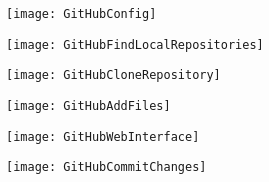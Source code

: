 \documentclass[swedish]{beamer}
\newenvironment{dialogue}{%
\VerbatimEnvironment
\begin{Verbatim}[fontsize=\footnotesize,commandchars=\#\(\)]%
}
{%
\end{Verbatim}
}
\begin{document}
\begin{frame}[fragile]
\texttt{[image: GitHubConfig]}
\end{frame}

\begin{frame}[fragile]
\texttt{[image: GitHubFindLocalRepositories]}
\end{frame}

\begin{frame}
\texttt{[image: GitHubCloneRepository]}
\end{frame}

\begin{frame}[fragile]
\texttt{[image: GitHubAddFiles]}
\end{frame}

\begin{frame}[fragile]
\texttt{[image: GitHubWebInterface]}
\end{frame}

\begin{frame}[fragile]
\texttt{[image: GitHubCommitChanges]}
\end{frame}

\begin{frame}[fragile]

\end{frame}






\end{document}

